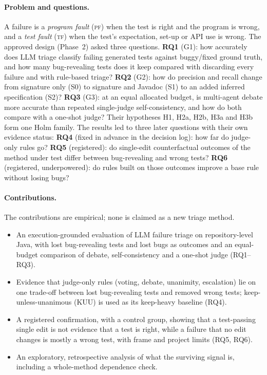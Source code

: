 \documentclass[journal]{IEEEtran}
\newcommand{\PF}{\textsc{pf}}
\newcommand{\TF}{\textsc{tf}}
\begin{document}
\paragraph{Problem and questions.} A failure is a \emph{program fault} (\PF) when the test is right and the program is wrong, and a \emph{test fault} (\TF) when the test's expectation, set-up or API use is wrong. The approved design (Phase~2) asked three questions. \textbf{RQ1} (G1): how accurately does LLM triage classify failing generated tests against buggy/fixed ground truth, and how many bug-revealing tests does it keep compared with discarding every failure and with rule-based triage? \textbf{RQ2} (G2): how do precision and recall change from signature only (S0) to signature and Javadoc (S1) to an added inferred specification (S2)? \textbf{RQ3} (G3): at an equal allocated budget, is multi-agent debate more accurate than repeated single-judge self-consistency, and how do both compare with a one-shot judge? Their hypotheses H1, H2a, H2b, H3a and H3b form one Holm family. The results led to three later questions with their own evidence status: \textbf{RQ4} (fixed in advance in the decision log): how far do judge-only rules go? \textbf{RQ5} (registered): do single-edit counterfactual outcomes of the method under test differ between bug-revealing and wrong tests? \textbf{RQ6} (registered, underpowered): do rules built on those outcomes improve a base rule without losing bugs?

\paragraph{Contributions.} The contributions are empirical; none is claimed as a new triage method.
\begin{itemize}
\item An execution-grounded evaluation of LLM failure triage on repository-level Java, with lost bug-revealing tests and lost bugs as outcomes and an equal-budget comparison of debate, self-consistency and a one-shot judge (RQ1--RQ3).
\item Evidence that judge-only rules (voting, debate, unanimity, escalation) lie on one trade-off between lost bug-revealing tests and removed wrong tests; keep-unless-unanimous (KUU) is used as its keep-heavy baseline (RQ4).
\item A registered confirmation, with a control group, showing that a test-passing single edit is not evidence that a test is right, while a failure that no edit changes is mostly a wrong test, with frame and project limits (RQ5, RQ6).
\item An exploratory, retrospective analysis of what the surviving signal is, including a whole-method dependence check.
\end{itemize}
\end{document}
